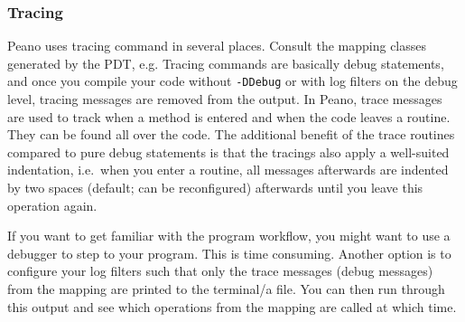 \subsubsection{Tracing}

Peano uses tracing command in several places. 
Consult the mapping classes generated by the PDT, e.g. 
Tracing commands are basically debug statements, and once you compile your code
without \texttt{-DDebug} or with log filters on the debug level, tracing
messages are removed from the output.
In Peano, trace messages are used to track when a method is entered and when the
code leaves a routine.
They can be found all over the code.
The additional benefit of the trace routines compared to pure debug statements
is that the tracings also apply a well-suited indentation, i.e.~when you enter a
routine, all messages afterwards are indented by two spaces (default; can be
reconfigured) afterwards until you leave this operation again.


\begin{remark}
If you want to get familiar with the program workflow, you might want to use a
debugger to step to your program.
This is time consuming.
Another option is to configure your log filters such that only the trace
messages (debug messages) from the mapping are printed to the terminal/a file.
You can then run through this output and see which operations from the mapping
are called at which time.
\end{remark}








